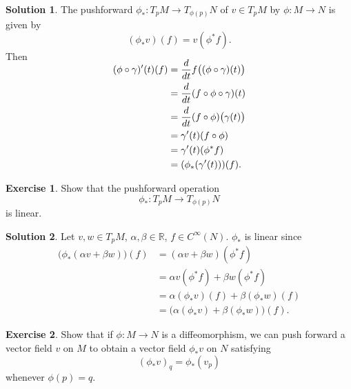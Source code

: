 \documentclass[11pt, a4paper]{report}
\theoremstyle{definition}
\newtheorem{ex}{Exercise}[part]
\newtheorem{sol}{Solution}[part]
\newenvironment{nowidthtags}{\usetagform{nowidth}}{\ignorespacesafterend}
\begin{document}
\begin{sol}

The pushforward $\phi_*: T_p M \to T_{\phi(p)} N$ of $v \in T_p M$ by $\phi: M \to N$ is given by
\begin{nowidthtags}
\[
    (\phi_* v) (f) = v (\phi^* f). \tag{pushforward of a vector}\label{eq:pushforwardvector}
\]
\end{nowidthtags}
Then
\begin{align*}
    \SwapAboveDisplaySkip
    (\phi \circ \gamma)'(t)(f) &= \frac{d}{dt} f \bigl( (\phi \circ \gamma)(t) \bigr) \\
        &= \frac{d}{dt} (f \circ \phi \circ \gamma)(t) \\
        &= \frac{d}{dt} (f \circ \phi) \bigl( \gamma(t) \bigr) \\
        &= \gamma'(t)(f \circ \phi) \\
        &= \gamma'(t)(\phi^* f) \\
        &= (\phi_* (\gamma'(t)))(f).
\end{align*}

\end{sol}

\begin{ex}

Show that the pushforward operation
\[
    \phi_*: T_p M \to T_{\phi(p)} N
\]
is linear.

\end{ex}

\begin{sol}

Let $v, w \in T_p M$, $\alpha, \beta \in \mathbb{R}$, $f \in C^\infty(N)$. $\phi_*$ is linear since
\begin{align*}
    \bigl( \phi_*(\alpha v + \beta w) \bigr)(f) &= (\alpha v + \beta w) (\phi^* f) \\
        &= \alpha v (\phi^* f) + \beta w (\phi^* f) \\
        &= \alpha (\phi_* v)(f) + \beta (\phi_* w)(f) \\
        &= \bigl( \alpha (\phi_* v) + \beta (\phi_* w) \bigr)(f).
\end{align*}

\end{sol}

\begin{ex}

Show that if $\phi: M \to N$ is a diffeomorphism, we can push forward a vector field $v$ on $M$ to obtain a vector field $\phi_*v$ on $N$ satisfying
\[
    {(\phi_* v)}_q = \phi_*(v_p)
\]
whenever $\phi(p) = q$.

\end{ex}
\end{document}
